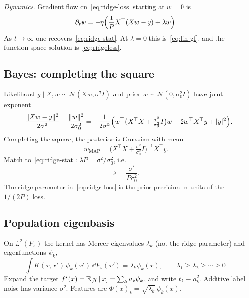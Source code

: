 \emph{Dynamics.} Gradient flow on~\eqref{eq:ridge-loss} starting at $w=0$ is
\begin{equation}
  \partial_t w
  =-\eta\Bigl(\frac1P X^\top(Xw-y)+\lambda w\Bigr).
  \label{eq:ridge-gf}
\end{equation}
As $t\to\infty$ one recovers~\eqref{eq:ridge-stat}. At $\lambda=0$ this is~\eqref{eq:lin-gf}, and the function-space solution is~\eqref{eq:ridgeless}.

\subsection{Bayes: completing the square}

Likelihood $y\mid X,w\sim\mathcal{N}(Xw,\sigma^2 I)$ and prior $w\sim\mathcal{N}(0,\sigma_0^2 I)$ have joint exponent
\begin{equation}
  -\frac{\|Xw-y\|^2}{2\sigma^2}-\frac{\|w\|^2}{2\sigma_0^2}
  =-\frac1{2\sigma^2}\Bigl(
    w^\top\bigl(X^\top X+\tfrac{\sigma^2}{\sigma_0^2}I\bigr)w
    -2 w^\top X^\top y
    +\lvert y\rvert^2
  \Bigr).
  \label{eq:bayes-exp}
\end{equation}
Completing the square, the posterior is Gaussian with mean
\begin{equation}
  w_{\mathrm{MAP}}
  =\bigl(X^\top X+\tfrac{\sigma^2}{\sigma_0^2}I\bigr)^{-1} X^\top y.
  \label{eq:bayes-mean}
\end{equation}
Match to~\eqref{eq:ridge-stat}: $\lambda P=\sigma^2/\sigma_0^2$, i.e.
\begin{equation}
  \lambda=\frac{\sigma^2}{P\sigma_0^2}.
  \label{eq:lambda-bayes}
\end{equation}
The ridge parameter in~\eqref{eq:ridge-loss} is the prior precision in units of the $1/(2P)$ loss.

\subsection{Population eigenbasis}

On $L^2(P_x)$ the kernel has Mercer eigenvalues $\lambda_k$ (not the ridge parameter) and eigenfunctions $\psi_k$,
\begin{equation}
  \int K(x,x')\,\psi_k(x')\,\dd P_x(x')
  =\lambda_k\psi_k(x),
  \qquad
  \lambda_1\ge\lambda_2\ge\cdots\ge 0.
  \label{eq:mercer}
\end{equation}
Expand the target $f^\star(x)=\mathbb{E}[y\mid x]=\sum_k \bar a_k\psi_k$, and write $t_k\equiv\bar a_k^2$. Additive label noise has variance $\sigma^2$. Features are $\Phi(x)_k=\sqrt{\lambda_k}\,\psi_k(x)$.


